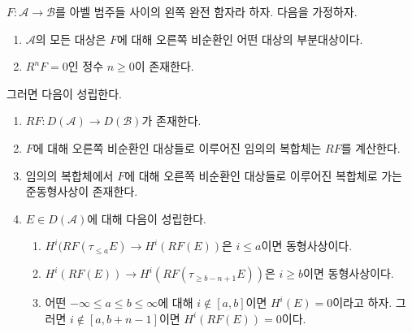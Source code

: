 \begin{lemma}
\label{lemma-unbounded-right-derived}
$F : \mathcal{A} \to \mathcal{B}$를 아벨 범주들 사이의 왼쪽 완전
함자라 하자. 다음을 가정하자.
\begin{enumerate}
\item $\mathcal{A}$의 모든 대상은 $F$에 대해 오른쪽 비순환인 어떤
대상의 부분대상이다.
\item $R^nF = 0$인 정수 $n \geq 0$이 존재한다.
\end{enumerate}
그러면 다음이 성립한다.
\begin{enumerate}
\item $RF : D(\mathcal{A}) \to D(\mathcal{B})$가 존재한다.
\item $F$에 대해 오른쪽 비순환인 대상들로 이루어진 임의의 복합체는
$RF$를 계산한다.
\item 임의의 복합체에서 $F$에 대해 오른쪽 비순환인 대상들로 이루어진
복합체로 가는 준동형사상이 존재한다.
\item $E \in D(\mathcal{A})$에 대해 다음이 성립한다.
\begin{enumerate}
\item $H^i(RF(\tau_{\leq a}E) \to H^i(RF(E))$은 $i \leq a$이면
동형사상이다.
\item $H^i(RF(E)) \to H^i(RF(\tau_{\geq b - n + 1}E))$은
$i \geq b$이면 동형사상이다.
\item 어떤 $-\infty \leq a \leq b \leq \infty$에 대해
$i \not \in [a, b]$이면 $H^i(E) = 0$이라고 하자. 그러면
$i \not \in [a, b + n - 1]$이면 $H^i(RF(E)) = 0$이다.
\end{enumerate}
\end{enumerate}
\end{lemma}

